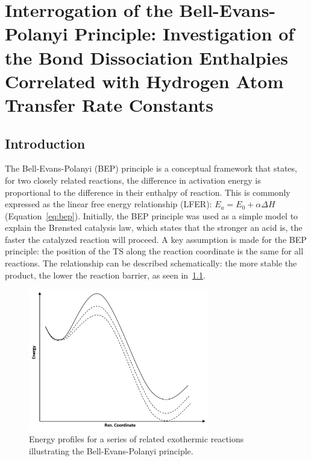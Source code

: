 
\chapter{Interrogation of the Bell-Evans-Polanyi Principle: Investigation of
the Bond Dissociation Enthalpies Correlated with Hydrogen Atom Transfer Rate
Constants} \label{ch:bde}

\section{Introduction}

The Bell-Evans-Polanyi (BEP) principle is a conceptual framework that states,
for two closely related reactions, the difference in activation energy is
proportional to the difference in their enthalpy of
reaction.\cite{Bell1936,Evans1938,Dill2003} This is commonly expressed as the
linear free energy relationship (LFER): $E_a = E_0 + \alpha \Delta H$
(Equation~\ref{eq:bep}). Initially, the BEP principle was used as a simple
model to explain the Br{\o}nsted catalysis law, which states that the stronger
an acid is, the faster the catalyzed reaction will proceed.\cite{Bronsted1924}
A key assumption is made for the BEP principle: the position of the TS along
the reaction coordinate is the same for all reactions. The relationship can be
described schematically: the more stable the product, the lower the reaction
barrier, as seen in~\ref{fig:bep}.

\begin{figure}[!htbp]
  \centering
  \includegraphics[width=0.7\textwidth]{figures/bep}
  \caption{Energy profiles for a series of related exothermic reactions
  illustrating the Bell-Evans-Polanyi principle.} \label{fig:bep}
\end{figure}

